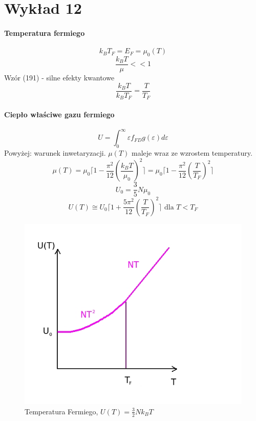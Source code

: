 \documentclass{article}
\begin{document}
	\section{Wykład 12}
		\paragraph{Temperatura fermiego}
		\begin{equation}
			k_BT_F = E_F = \mu_0(T) 
		\end{equation}
		\begin{equation}
		\frac{k_BT}{\mu} << 1
		\end{equation}
		Wzór (191) - silne efekty kwantowe	
		\begin{equation}
		\frac{k_BT}{k_BT_F} = \frac{T}{T_F}
		\end{equation}
		\paragraph{Ciepło właściwe gazu fermiego}
		\begin{equation}
		U = \int_{0}^{\infty}\varepsilon f_{FD}g(\varepsilon)d \varepsilon
		\end{equation}
		Powyżej: warunek inwetaryzacji. $ \mu(T) $ maleje wraz ze wzrostem temperatury.
		\begin{equation}
		\mu(T) = \mu_0 \lceil 1 - \frac{\pi^2}{12}(\frac{k_BT}{\mu_0})^2 \rceil = 
		 \mu_0 \lceil 1 - \frac{\pi^2}{12}(\frac{T}{T_F})^2 \rceil
		\end{equation}
		\begin{equation}
		U_0 = \frac{3}{5}N\mu_0
		\end{equation}
		\begin{equation}
		U(T) \cong U_0 \lceil 1 + \frac{5\pi^2}{12}(\frac{T}{T_F})^2 \rceil		 
		\text{ dla } T < T_F
		\end{equation}
		\begin{figure}[ht]
			\label{fig:fig1}
			\centering
			\includegraphics[scale=0.5]{gaz_fermiego.jpeg}
			\caption{Temperatura Fermiego, $ U(T) = \frac{3}{2}Nk_BT $}
		\end{figure}
\end{document}
